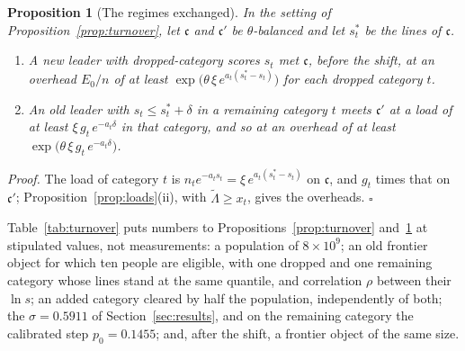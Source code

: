 \documentclass{article}
\newtheorem{proposition}{Proposition}
\begin{document}
\begin{proposition}[The regimes exchanged]\label{prop:exchange}
In the setting of Proposition~\ref{prop:turnover}, let $\mathfrak{c}$ and $\mathfrak{c}'$ be $\theta$-balanced and let $s^{\ast}_t$ be the lines of $\mathfrak{c}$.
\begin{enumerate}
  \item[(i)] A new leader with dropped-category scores $s_t$ met $\mathfrak{c}$, before the shift, at an overhead $E_0/n$ of at least $\exp\big(\theta\,\xi\,e^{a_t(s^{\ast}_t - s_t)}\big)$ for each dropped category $t$.
  \item[(ii)] An old leader with $s_t \leq s^{\ast}_t + \delta$ in a remaining category $t$ meets $\mathfrak{c}'$ at a load of at least $\xi\,g_t\,e^{-a_t\delta}$ in that category, and so at an overhead of at least $\exp\big(\theta\,\xi\,g_t\,e^{-a_t\delta}\big)$.
\end{enumerate}
\end{proposition}

\noindent\textit{Proof.} The load of category $t$ is $n_t e^{-a_t s_t} = \xi\,e^{a_t(s^{\ast}_t - s_t)}$ on $\mathfrak{c}$, and $g_t$ times that on $\mathfrak{c}'$; Proposition~\ref{prop:loads}(ii), with $\widetilde{\Lambda} \geq x_t$, gives the overheads. $\square$

Table~\ref{tab:turnover} puts numbers to Propositions~\ref{prop:turnover} and~\ref{prop:exchange} at stipulated values, not measurements: a population of $8 \times 10^{9}$; an old frontier object for which ten people are eligible, with one dropped and one remaining category whose lines stand at the same quantile, and correlation $\rho$ between their $\ln s$; an added category cleared by half the population, independently of both; the $\sigma = 0.5911$ of Section~\ref{sec:results}, and on the remaining category the calibrated step $p_0 = 0.1455$; and, after the shift, a frontier object of the same size.
\end{document}
